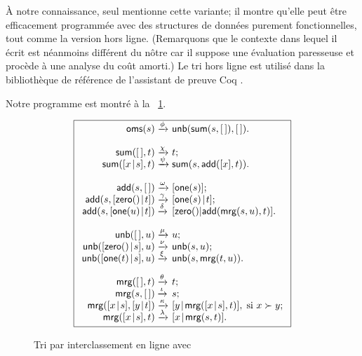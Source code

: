 À notre connaissance, seul \cite{Okasaki_1998a} mentionne cette
variante; il montre qu'elle peut être efficacement programmée avec des
structures de données purement fonctionnelles, tout comme la version
hors ligne. (Remarquons que le contexte dans lequel il écrit est
néanmoins différent du nôtre car il suppose une évaluation paresseuse
et procède à une analyse du coût amorti.) Le tri hors ligne est
utilisé dans la bibliothèque de référence de l'assistant de preuve
 \textsf{Coq} \citep{BertotCasteran_2004}.

Notre programme est montré à la \fig~\ref{fig:oms}.
\begin{figure}
\begin{equation*}
\boxed{%
\begin{array}{r@{\;}l@{\;}l}
\fun{oms}(s)   & \xrightarrow{\smash{\phi}}
               & \fun{unb}(\fun{sum}(s,\el),\el).\\
\\
\fun{sum}(\el,t)         & \xrightarrow{\smash{\chi}} & t;\\
\fun{sum}(\cons{x}{s},t) & \xrightarrow{\smash{\psi}}
                         & \fun{sum}(s,\fun{add}([x],t)).\\
\\
\fun{add}(s,\el) & \xrightarrow{\smash{\omega}} & [\fun{one}(s)];\\
\fun{add}(s,\cons{\fun{zero}()}{t})
                    & \xrightarrow{\smash{\gamma}}
                    & \cons{\fun{one}(s)}{t};\\
\fun{add}(s,\cons{\fun{one}(u)}{t}) & \xrightarrow{\smash{\delta}}
                    & [\fun{zero}()|\fun{add}(\fun{mrg}(s,u),t)].\\
\\
\fun{unb}(\el,u) & \xrightarrow{\smash{\mu}} & u;\\
\fun{unb}(\cons{\fun{zero}()}{s},u)
                 & \xrightarrow{\smash{\nu}} & \fun{unb}(s,u);\\
\fun{unb}(\cons{\fun{one}(t)}{s},u)
                 & \xrightarrow{\smash{\xi}}
                 & \fun{unb}(s,\fun{mrg}(t,u)).\\
\\
\fun{mrg}(\el,t)         & \xrightarrow{\smash{\theta}} & t;\\
\fun{mrg}(s,\el)         & \xrightarrow{\smash{\iota}} & s;\\
\fun{mrg}(\cons{x}{s},\cons{y}{t}) & \xrightarrow{\smash{\kappa}}
                         & \cons{y}{\fun{mrg}(\cons{x}{s},t)},\;
                           \text{si \(x \succ y\)};\\
\fun{mrg}(\cons{x}{s},t) & \xrightarrow{\smash{\lambda}}
                         & \cons{x}{\fun{mrg}(s,t)}.
\end{array}}
\end{equation*}
\caption{Tri par interclassement en ligne avec }
\label{fig:oms}
\end{figure}

